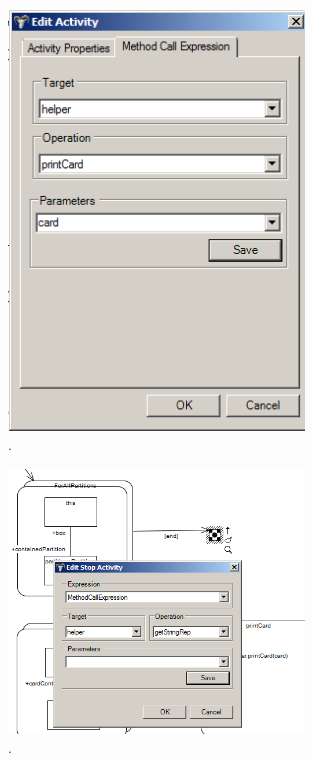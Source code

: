 \begin{figure}[htp]
\begin{center}
  \includegraphics[width=0.7\textwidth]{pics/sdmBilder/toString/sdm74}
  \caption{.}  
  \label{fig:sdm_invert_}
\end{center}
\end{figure}

\begin{figure}[htp]
\begin{center}
  \includegraphics[width=0.7\textwidth]{pics/sdmBilder/toString/sdm75}
  \caption{.}  
  \label{fig:sdm_invert_}
\end{center}
\end{figure}

